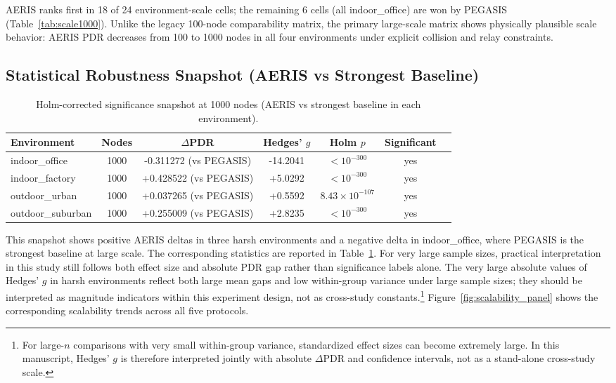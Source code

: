 ﻿\documentclass[sensors,article,submit,moreauthors,pdftex]{Definitions/mdpi}
\begin{document}
AERIS ranks first in 18 of 24 environment-scale cells; the remaining 6 cells (all indoor\_office) are won by PEGASIS (Table~\ref{tab:scale1000}).
Unlike the legacy 100-node comparability matrix, the primary large-scale matrix shows physically plausible scale behavior: AERIS PDR decreases from 100 to 1000 nodes in all four environments under explicit collision and relay constraints.

\subsection{Statistical Robustness Snapshot (AERIS vs Strongest Baseline)}
\begin{table}[H]
\caption{Holm-corrected significance snapshot at 1000 nodes (AERIS vs strongest baseline in each environment).}
\label{tab:robust_snapshot}
\centering
\begin{tabular}{lcccccc}
\toprule
Environment & Nodes & $\Delta$PDR & Hedges' $g$ & Holm $p$ & Significant \\
\midrule
indoor\_office    & 1000 & -0.311272 (vs PEGASIS) & -14.2041 & $<10^{-300}$ & yes \\
indoor\_factory   & 1000 & +0.428522 (vs PEGASIS) & +5.0292 & $<10^{-300}$ & yes \\
outdoor\_urban    & 1000 & +0.037265 (vs PEGASIS) & +0.5592 & $8.43\times10^{-107}$ & yes \\
outdoor\_suburban & 1000 & +0.255009 (vs PEGASIS) & +2.8235 & $<10^{-300}$ & yes \\
\bottomrule
\end{tabular}
\end{table}

This snapshot shows positive AERIS deltas in three harsh environments and a negative delta in indoor\_office, where PEGASIS is the strongest baseline at large scale.
The corresponding statistics are reported in Table~\ref{tab:robust_snapshot}.
For very large sample sizes, practical interpretation in this study still follows both effect size and absolute PDR gap rather than significance labels alone.
The very large absolute values of Hedges' $g$ in harsh environments reflect both large mean gaps and low within-group variance under large sample sizes; they should be interpreted as magnitude indicators within this experiment design, not as cross-study constants.\footnote{For large-\(n\) comparisons with very small within-group variance, standardized effect sizes can become extremely large. In this manuscript, Hedges' \(g\) is therefore interpreted jointly with absolute \(\Delta\)PDR and confidence intervals, not as a stand-alone cross-study scale.}
Figure~\ref{fig:scalability_panel} shows the corresponding scalability trends across all five protocols.
\end{document}
